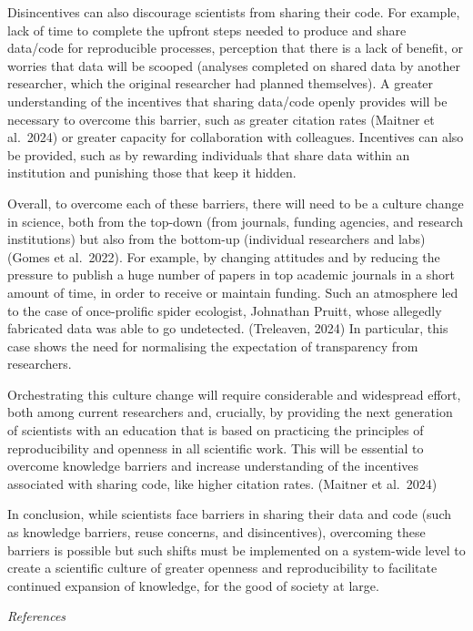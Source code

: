 \documentclass[
]{article}
\begin{document}
Disincentives can also discourage scientists from sharing their code.
For example, lack of time to complete the upfront steps needed to
produce and share data/code for reproducible processes, perception that
there is a lack of benefit, or worries that data will be scooped
(analyses completed on shared data by another researcher, which the
original researcher had planned themselves). A greater understanding of
the incentives that sharing data/code openly provides will be necessary
to overcome this barrier, such as greater citation rates (Maitner et
al.~2024) or greater capacity for collaboration with colleagues.
Incentives can also be provided, such as by rewarding individuals that
share data within an institution and punishing those that keep it
hidden.

Overall, to overcome each of these barriers, there will need to be a
culture change in science, both from the top-down (from journals,
funding agencies, and research institutions) but also from the bottom-up
(individual researchers and labs) (Gomes et al.~2022). For example, by
changing attitudes and by reducing the pressure to publish a huge number
of papers in top academic journals in a short amount of time, in order
to receive or maintain funding. Such an atmosphere led to the case of
once-prolific spider ecologist, Johnathan Pruitt, whose allegedly
fabricated data was able to go undetected. (Treleaven, 2024) In
particular, this case shows the need for normalising the expectation of
transparency from researchers.

Orchestrating this culture change will require considerable and
widespread effort, both among current researchers and, crucially, by
providing the next generation of scientists with an education that is
based on practicing the principles of reproducibility and openness in
all scientific work. This will be essential to overcome knowledge
barriers and increase understanding of the incentives associated with
sharing code, like higher citation rates. (Maitner et al.~2024)

In conclusion, while scientists face barriers in sharing their data and
code (such as knowledge barriers, reuse concerns, and disincentives),
overcoming these barriers is possible but such shifts must be
implemented on a system-wide level to create a scientific culture of
greater openness and reproducibility to facilitate continued expansion
of knowledge, for the good of society at large.

\emph{References}
\end{document}
